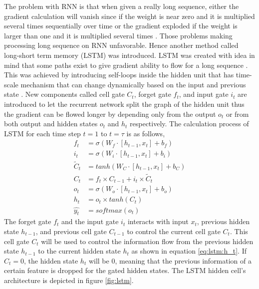     The problem with RNN is that when given a really long sequence,
    either the gradient calculation will vanish since if the weight is
    near zero and it is multiplied several times sequentially over
    time or the gradient exploded if the weight is larger than one
    and it is multiplied several times \citep{Goodfellow-et-al-2016}.
    Those problems making processing long sequence on RNN unfavorable.
    Hence another method called long-short term memory (LSTM) was
    introduced. LSTM was created with idea in mind that some paths
    exist to give gradient ability to flow for a long sequence
    \citep{Goodfellow-et-al-2016}. This was achieved by introducing
    self-loops inside the hidden unit that has time-scale mechanism
    that can change dynamically based on the input and previous state
    \citep{Goodfellow-et-al-2016}. New components called cell gate
    $C_t$, forget gate $f_t$, and input gate $i_t$ are introduced to
    let the recurrent network split the graph of the hidden unit thus the
    gradient can be flowed longer by depending only from the output
    $o_t$ or from both output and hidden states $o_t$ and $h_t$
    respectively. The calculation process of LSTM for each time step
    $t=1$ to $t=\tau$ is as follows,
    \begin{align}
        \label{eq:lstm:f_t}
        f_t &= \sigma(W_f \cdot [h_{t-1}, x_t] + b_f) \\
        \label{eq:lstm:i_t}    
        i_t &= \sigma(W_i \cdot [h_{t-1}, x_t] + b_i) \\
        \label{eq:lstm:Cc_t}
        \tilde{C}_t &= tanh(W_C \cdot [h_{t-1}, x_t] + b_C) \\
        \label{eq:lstm:C_t}
        C_t &= f_t \times C_{t-1} + i_t \times \tilde{C}_t \\
        \label{eq:lstm:o_t}
        o_t &= \sigma(W_o \cdot [h_{t-1}, x_t] + b_o) \\
        \label{eq:lstm:h_t}
        h_t &= o_t \times tanh(C_t) \\
        \label{eq:lstm:y_t}
        \hat{y_t} &= softmax(o_t)
    \end{align}
    The forget gate $f_t$ and the input gate $i_t$ interacts with
    input $x_t$, previous hidden state $h_{t-1}$, and previous cell
    gate $C_{t-1}$ to control the current cell gate $C_t$. This cell
    gate $C_t$ will be used to control the information flow from
    the previous hidden state $h_{t-1}$ to the current hidden state $h_t$
    as shown in equation \ref{eq:lstm:h_t}. If $C_t = 0$, the hidden
    state $h_t$ will be $0$, meaning that the previous information of a
    certain feature is dropped for the gated hidden states. The LSTM
    hidden cell's architecture is depicted in figure \ref{fig:lstm}.

